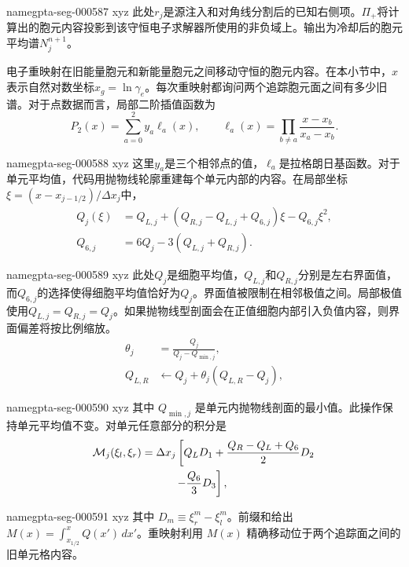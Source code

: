 \documentclass[twocolumn]{aastex702}
\makeatletter
\providecommand{\gptareaderanchor}[1]{\pdfdest name{#1} xyz}%
\providecommand{\gptareaderanchor}[1]{\special{pdf:dest (#1) [ @thispage /XYZ @xpos @ypos null ]}}%
\makeatother
\begin{document}
\gptareaderanchor{gpta-seg-000587}%
此处\(r_j\)是源注入和对角线分割后的已知右侧项。\(\Pi_+\)将计算出的胞元内容投影到该守恒电子求解器所使用的非负域上。输出为冷却后的胞元平均谱\(N_j^{n+1}\)。

电子重映射在旧能量胞元和新能量胞元之间移动守恒的胞元内容。在本小节中，\(x\)表示自然对数坐标\(x_g=\ln\gamma_e\)。每次重映射都询问两个追踪胞元面之间有多少旧谱。对于点数据而言，局部二阶插值函数为
\begin{equation}
P_2(x)=\sum_{a=0}^{2}y_a\ell_a(x),
\qquad
\ell_a(x)=\prod_{b\ne a}\frac{x-x_b}{x_a-x_b}.
\end{equation}

\gptareaderanchor{gpta-seg-000588}%
这里\(y_a\)是三个相邻点的值，\(\ell_a\)是拉格朗日基函数。对于单元平均值，代码用抛物线轮廓重建每个单元内部的内容。在局部坐标\(\xi=(x-x_{j-1/2})/\Delta x_j\)中，
\begin{equation}
\begin{aligned}
Q_j(\xi)&=Q_{L,j}
+(Q_{R,j}-Q_{L,j}+Q_{6,j})\xi
-Q_{6,j}\xi^2,\\
Q_{6,j}&=6Q_j-3(Q_{L,j}+Q_{R,j}).
\end{aligned}
\end{equation}

\gptareaderanchor{gpta-seg-000589}%
此处\(Q_j\)是细胞平均值，\(Q_{L,j}\)和\(Q_{R,j}\)分别是左右界面值，而\(Q_{6,j}\)的选择使得细胞平均值恰好为\(Q_j\)。界面值被限制在相邻极值之间。局部极值使用\(Q_{L,j}=Q_{R,j}=Q_j\)。如果抛物线型剖面会在正值细胞内部引入负值内容，则界面偏差将按比例缩放。
\begin{equation}
\begin{aligned}
\theta_j&=\frac{Q_j}{Q_j-Q_{\min,j}},\\
Q_{L,R}&\leftarrow Q_j+\theta_j(Q_{L,R}-Q_j),
\end{aligned}
\end{equation}

\gptareaderanchor{gpta-seg-000590}%
其中 \(Q_{\min,j}\) 是单元内抛物线剖面的最小值。此操作保持单元平均值不变。对单元任意部分的积分是
\begin{equation}
\begin{aligned}
{\cal M}_j(\xi_l,\xi_r)
&=\Delta x_j\left[
Q_LD_1+\frac{Q_R-Q_L+Q_6}{2}D_2\right.\\
&\left.\hspace{3.0em}
-\frac{Q_6}{3}D_3
\right],
\end{aligned}
\end{equation}

\gptareaderanchor{gpta-seg-000591}%
其中 \(D_m\equiv\xi_r^m-\xi_l^m\)。前缀和给出 \(M(x)=\int_{x_{1/2}}^xQ(x')\,dx'\)。重映射利用 \(M(x)\) 精确移动位于两个追踪面之间的旧单元格内容。
\end{document}
